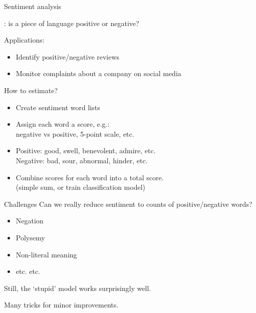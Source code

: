 \documentclass[aspectratio=169,usenames,dvipsnames]{beamer}
\begin{document}
\begin{frame}{Sentiment analysis}
    \begin{definition}
        : 
            is a piece of language positive or negative?
    \end{definition}

    Applications:
    \begin{itemize}
        \item Identify positive/negative reviews
        \item Monitor complaints about a company on social media
    \end{itemize}

    \pause
    How to estimate?
    \begin{itemize}
        \item Create sentiment word lists
        \item Assign each word a score, e.g.: \\
            negative vs positive, 5-point scale, etc.
        \item Positive: good, swell, benevolent, admire, etc. \\
                Negative: bad, sour, abnormal, hinder, etc.
        \item Combine scores for each word into a total score. \\
                (simple sum, or train classification model)
    \end{itemize}
\end{frame}

\begin{frame}{Challenges}
    Can we really reduce sentiment to counts of positive/negative words?

    \begin{itemize}
        \item Negation
        \item Polysemy
        \item Non-literal meaning
        \item etc. etc.
    \end{itemize}

	\vspace{1em}
    Still, the `stupid' model works surprisingly well.

    Many tricks for minor improvements.
\end{frame}
\end{document}
